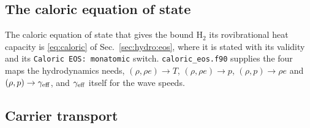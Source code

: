 \subsection{The caloric equation of state}
\label{sec:mol:caloric}

The caloric equation of state that gives the bound H$_2$ its rovibrational
heat capacity is \eqref{eq:caloric} of Sec.~\ref{sec:hydro:eos}, where it is
stated with its validity and its \texttt{Caloric EOS: monatomic} switch.
\texttt{caloric\_eos.f90} supplies the four maps the hydrodynamics needs,
$(\rho,\rho e)\to T$, $(\rho,\rho e)\to p$, $(\rho,p)\to\rho e$ and
$(\rho,p)\to\gamma_{\rm eff}$, and $\gamma_{\rm eff}$ itself for the wave
speeds.

\subsection{Carrier transport}
\label{sec:mol:carrier}

